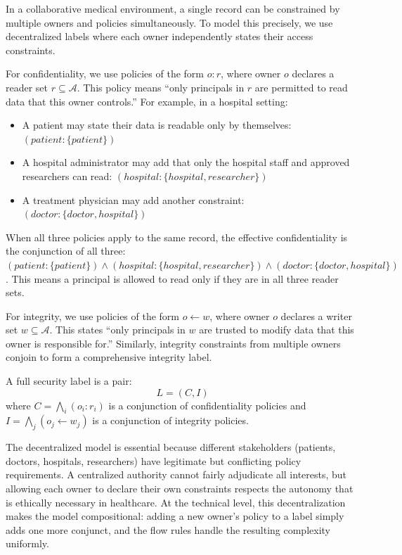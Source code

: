 In a collaborative medical environment, a single record can be constrained by multiple owners and policies simultaneously. To model this precisely, we use decentralized labels where each owner independently states their access constraints.

For confidentiality, we use policies of the form $o:r$, where owner $o$ declares a reader set $r \subseteq \mathcal{A}$. This policy means ``only principals in $r$ are permitted to read data that this owner controls.'' For example, in a hospital setting:
\begin{itemize}
    \item A patient may state their data is readable only by themselves: $(patient:\{patient\})$
    \item A hospital administrator may add that only the hospital staff and approved researchers can read: $(hospital:\{hospital,researcher\})$
    \item A treatment physician may add another constraint: $(doctor:\{doctor,hospital\})$
\end{itemize}

When all three policies apply to the same record, the effective confidentiality is the conjunction of all three: $(patient:\{patient\}) \wedge (hospital:\{hospital,researcher\}) \wedge (doctor:\{doctor,hospital\})$. This means a principal is allowed to read only if they are in all three reader sets.

For integrity, we use policies of the form $o \leftarrow w$, where owner $o$ declares a writer set $w \subseteq \mathcal{A}$. This states ``only principals in $w$ are trusted to modify data that this owner is responsible for.'' Similarly, integrity constraints from multiple owners conjoin to form a comprehensive integrity label.

A full security label is a pair:
\[
L = (C, I)
\]
where $C = \bigwedge_i (o_i:r_i)$ is a conjunction of confidentiality policies and $I = \bigwedge_j (o_j \leftarrow w_j)$ is a conjunction of integrity policies.

The decentralized model is essential because different stakeholders (patients, doctors, hospitals, researchers) have legitimate but conflicting policy requirements. A centralized authority cannot fairly adjudicate all interests, but allowing each owner to declare their own constraints respects the autonomy that is ethically necessary in healthcare. At the technical level, this decentralization makes the model compositional: adding a new owner's policy to a label simply adds one more conjunct, and the flow rules handle the resulting complexity uniformly.

